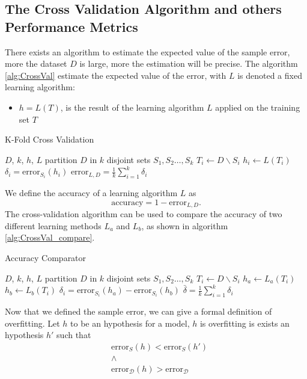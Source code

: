 \documentclass[10pt, letterpaper]{report}
\begin{document}
\subsection{The Cross Validation Algorithm and others Performance Metrics}
There exists an algorithm to estimate the expected value of the sample error, more the dataset $D$ is large, more the estimation will be precise.
The algorithm \ref{alg:CrossVal} estimate the expected value of the error, with $L$ is denoted a fixed learning algorithm:\begin{itemize}
    \item $h=L(T)$, is the result of the learning algorithm $L$ applied on the training set $T$
\end{itemize}
\begin{algorithm}
    \caption{K-Fold Cross Validation}\label{alg:CrossVal}
    \begin{algorithmic}
    \Require $D$, $k$, $h$, $L$
    \State partition $D$ in $k$ disjoint sets $S_1,S_2\dots, S_k$
    \State $T_i\leftarrow  D\backslash S_i$
    \State $h_i\leftarrow L(T_i) $
    \State $\delta_i = \text{error}_{S_i}(h_i)$
    \EndFor
    \State\Return $\text{error}_{L,D}=\displaystyle\frac{1}{k}\sum_{i=1}^k\delta_i$
    \end{algorithmic}
\end{algorithm}
We define the accuracy of a learning algorithm $L$ as \begin{equation}
    \text{accuracy}=1-\text{error}_{L,D}.
\end{equation}
The cross-validation algorithm can be used to compare the accuracy of two different learning methods $L_a$ and $L_b$, as shown in algorithm \ref{alg:CrossVal_compare}.

\begin{algorithm}
    \caption{Accuracy Comparator}\label{alg:CrossVal_compare}
    \begin{algorithmic}
    \Require $D$, $k$, $h$, $L$
    \State partition $D$ in $k$ disjoint sets $S_1,S_2\dots, S_k$
    \State $T_i\leftarrow  D\backslash S_i$
    \State $h_a\leftarrow L_a(T_i) $
    \State $h_b\leftarrow L_b(T_i) $
    \State $\delta_i = \text{error}_{S_i}(h_a)-\text{error}_{S_i}(h_b)$
    \EndFor
    \State\Return $\bar\delta=\displaystyle\frac{1}{k}\sum_{i=1}^k\delta_i$
    \end{algorithmic}
\end{algorithm}

Now that we defined the sample error, we can give a formal definition of overfitting. Let $h$  to be an hypothesis for a model, $h$ is overfitting is exists an hypothesis $h'$ such that\begin{align}
    &\text{error}_{S}(h)<\text{error}_{S}(h') \\ &\land\\
    &\text{error}_{\mathcal D}(h)>\text{error}_{\mathcal D}
\end{align}
\end{document}
